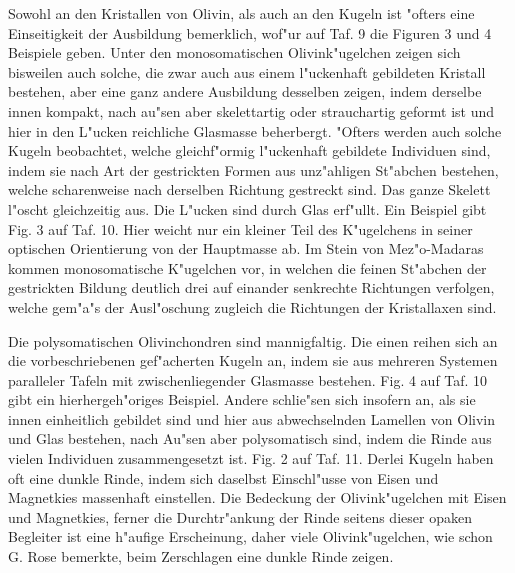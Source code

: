 \documentclass[a4paper, 11pt, oneside, polutonikogreek, german]{article}
\begin{document}
Sowohl an den Kristallen von Olivin, als auch an den Kugeln ist "ofters eine Einseitigkeit der Ausbildung bemerklich, wof"ur auf Taf. 9 die Figuren 3 und 4 Beispiele geben. Unter den monosomatischen Olivink"ugelchen zeigen sich bisweilen auch solche, die zwar auch aus einem l"uckenhaft gebildeten Kristall bestehen, aber eine ganz andere Ausbildung desselben zeigen, indem derselbe innen kompakt, nach au"sen aber skelettartig oder strauchartig geformt ist und hier in den L"ucken reichliche Glasmasse beherbergt. "Ofters werden auch solche Kugeln beobachtet, welche gleichf"ormig l"uckenhaft gebildete Individuen sind, indem sie nach Art der gestrickten Formen aus unz"ahligen St"abchen bestehen, welche scharenweise nach derselben Richtung gestreckt sind. Das ganze Skelett l"oscht gleichzeitig aus. Die L"ucken sind durch Glas erf"ullt. Ein Beispiel gibt Fig. 3 auf Taf. 10. Hier weicht nur ein kleiner Teil des K"ugelchens in seiner optischen Orientierung von der Hauptmasse ab. Im Stein von Mez"o-Madaras kommen monosomatische K"ugelchen vor, in welchen die feinen St"abchen der gestrickten Bildung deutlich drei auf einander senkrechte Richtungen verfolgen, welche gem"a"s der Ausl"oschung zugleich die Richtungen der Kristallaxen sind.

Die polysomatischen Olivinchondren sind mannigfaltig. Die einen reihen sich an die vorbeschriebenen gef"acherten Kugeln an, indem sie aus mehreren Systemen paralleler Tafeln mit zwischenliegender Glasmasse bestehen. Fig. 4 auf Taf. 10 gibt ein hierhergeh"origes Beispiel. Andere schlie"sen sich insofern an, als sie innen einheitlich gebildet sind und hier aus abwechselnden Lamellen von Olivin und Glas bestehen, nach Au"sen aber polysomatisch sind, indem die Rinde aus vielen Individuen zusammengesetzt ist. Fig. 2 auf Taf. 11. Derlei Kugeln haben oft eine dunkle Rinde, indem sich daselbst Einschl"usse von Eisen und Magnetkies massenhaft einstellen. Die Bedeckung der Olivink"ugelchen mit Eisen und Magnetkies, ferner die Durchtr"ankung der Rinde seitens dieser opaken Begleiter ist eine h"aufige Erscheinung, daher viele Olivink"ugelchen, wie schon G. Rose bemerkte, beim Zerschlagen eine dunkle Rinde zeigen.
\end{document}
